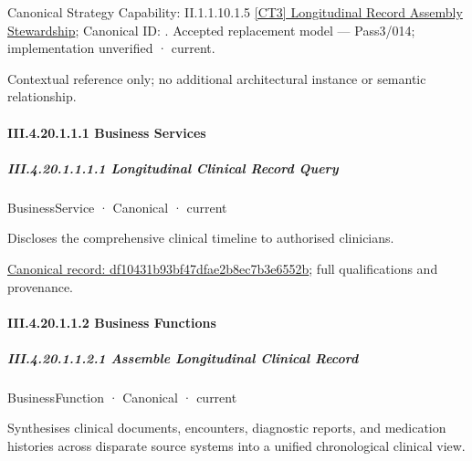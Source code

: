 {\small Canonical Strategy Capability: II.1.1.10.1.5 \hyperref[element:4507ca47f4bd40c085e069ac6e42888b]{[CT3] Longitudinal Record Assembly Stewardship}; Canonical ID: \texttt{}. Accepted replacement model — Pass3/014; implementation unverified · current.}\par
Contextual reference only; no additional architectural instance or semantic relationship.\par
\paragraph*{III.4.20.1.1.1 Business Services}
\label{navigation:III.4.20.1.1.1}

\subparagraph*{III.4.20.1.1.1.1 Longitudinal Clinical Record Query}
\label{navigation:III.4.20.1.1.1.1}

\label{element:df10431b93bf47dfae2b8ec7b3e6552b}
{\small BusinessService · Canonical · current}\par

Discloses the comprehensive clinical timeline to authorised clinicians.


{\footnotesize \href{../../../../../../../continuum/business/business-service/df10431b93bf47dfae2b8ec7b3e6552b.md}{Canonical record: df10431b93bf47dfae2b8ec7b3e6552b}; full qualifications and provenance.}\par
\paragraph*{III.4.20.1.1.2 Business Functions}
\label{navigation:III.4.20.1.1.2}

\subparagraph*{III.4.20.1.1.2.1 Assemble Longitudinal Clinical Record}
\label{navigation:III.4.20.1.1.2.1}

\label{element:65ea2d2427dd474d84f153671de79d63}
{\small BusinessFunction · Canonical · current}\par

Synthesises clinical documents, encounters, diagnostic reports, and medication histories across disparate source systems into a unified chronological clinical view.


